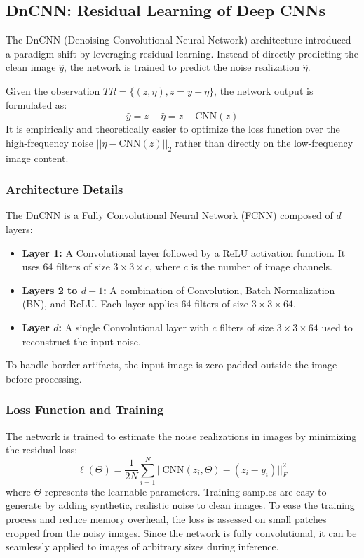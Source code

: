 \subsection{DnCNN: Residual Learning of Deep CNNs}
The DnCNN (Denoising Convolutional Neural Network) architecture introduced a paradigm shift by leveraging residual learning. Instead of directly predicting the clean image $\hat{y}$, the network is trained to predict the noise realization $\hat{\eta}$. 

Given the observation $TR = \{(z, \eta), z = y + \eta\}$, the network output is formulated as:
\begin{equation}
    \hat{y} = z - \hat{\eta} = z - \text{CNN}(z)
\end{equation}
It is empirically and theoretically easier to optimize the loss function over the high-frequency noise $||\eta - \text{CNN}(z)||_2$ rather than directly on the low-frequency image content.

\subsubsection{Architecture Details}
The DnCNN is a Fully Convolutional Neural Network (FCNN) composed of $d$ layers:
\begin{itemize}
    \item \textbf{Layer 1:} A Convolutional layer followed by a ReLU activation function. It uses 64 filters of size $3 \times 3 \times c$, where $c$ is the number of image channels.
    \item \textbf{Layers 2 to $d-1$:} A combination of Convolution, Batch Normalization (BN), and ReLU. Each layer applies 64 filters of size $3 \times 3 \times 64$.
    \item \textbf{Layer $d$:} A single Convolutional layer with $c$ filters of size $3 \times 3 \times 64$ used to reconstruct the input noise.
\end{itemize}
To handle border artifacts, the input image is zero-padded outside the image before processing. 

\subsubsection{Loss Function and Training}
The network is trained to estimate the noise realizations in images by minimizing the residual loss:
\begin{equation}
    \ell(\Theta) = \frac{1}{2N} \sum_{i=1}^N || \text{CNN}(z_i, \Theta) - (z_i - y_i) ||_F^2
\end{equation}
where $\Theta$ represents the learnable parameters. Training samples are easy to generate by adding synthetic, realistic noise to clean images. To ease the training process and reduce memory overhead, the loss is assessed on small patches cropped from the noisy images. Since the network is fully convolutional, it can be seamlessly applied to images of arbitrary sizes during inference. 

